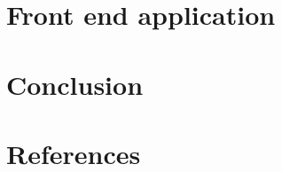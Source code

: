 \documentclass[twocolumn,10pt]{asme2ej}
\begin{document}
\section{Front end application}

\section{Conclusion}


\section{References}
\end{document}
